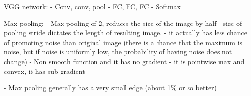 VGG network:
- Conv, conv, pool
- FC, FC, FC
- Softmax

Max pooling:
- Max pooling of 2, reduces the size of the image by half
- size of pooling stride dictates the length of resulting image.
- it actually has less chance of promoting noise than original image (there is a chance that the maximum is noise, but if noise is uniformly low, the probability of having noise does not change)
- Non smooth function and it has no gradient
- it is pointwise max and convex, it has sub-gradient
- 

- Max pooling generally has a very small edge (about 1\% or so better)

